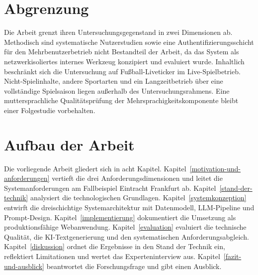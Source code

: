 \section{Abgrenzung}\label{abgrenzung}

Die Arbeit grenzt ihren Untersuchungsgegenstand in zwei Dimensionen ab. Methodisch sind systematische Nutzerstudien sowie eine Authentifizierungsschicht für den Mehrbenutzerbetrieb nicht Bestandteil der Arbeit, da das System als netzwerkisoliertes internes Werkzeug konzipiert und evaluiert wurde. Inhaltlich beschränkt sich die Untersuchung auf Fußball-Liveticker im Live-Spielbetrieb. Nicht-Spielinhalte, andere Sportarten und ein Langzeitbetrieb über eine vollständige Spielsaison liegen außerhalb des Untersuchungsrahmens. Eine muttersprachliche Qualitätsprüfung der Mehrsprachigkeitskomponente bleibt einer Folgestudie vorbehalten.

\section{Aufbau der Arbeit}\label{aufbau-der-arbeit}

Die vorliegende Arbeit gliedert sich in acht Kapitel. Kapitel~\ref{motivation-und-anforderungen} vertieft die drei Anforderungsdimensionen und leitet die Systemanforderungen am Fallbeispiel Eintracht Frankfurt ab. Kapitel~\ref{stand-der-technik} analysiert die technologischen Grundlagen. Kapitel~\ref{systemkonzeption} entwirft die dreischichtige Systemarchitektur mit Datenmodell, LLM-Pipeline und Prompt-Design. Kapitel~\ref{implementierung} dokumentiert die Umsetzung als produktionsfähige Webanwendung. Kapitel~\ref{evaluation} evaluiert die technische Qualität, die KI-Textgenerierung und den systematischen Anforderungsabgleich. Kapitel~\ref{diskussion} ordnet die Ergebnisse in den Stand der Technik ein, reflektiert Limitationen und wertet das Experteninterview aus. Kapitel~\ref{fazit-und-ausblick} beantwortet die Forschungsfrage und gibt einen Ausblick.
